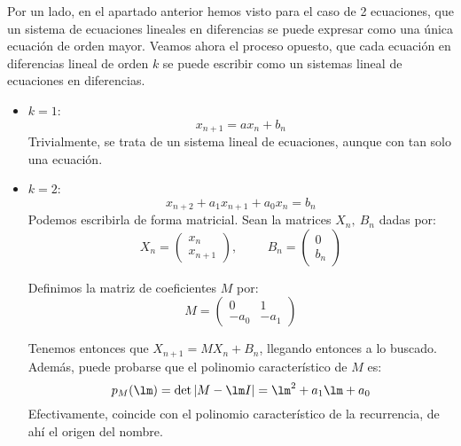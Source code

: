 Por un lado, en el apartado anterior hemos visto para el caso de 2 ecuaciones, que un sistema de ecuaciones lineales en diferencias se puede expresar como una única ecuación de orden mayor. Veamos ahora el proceso opuesto, que cada ecuación en diferencias lineal de orden $k$ se puede escribir como un sistemas lineal de ecuaciones en diferencias.
\begin{itemize}
    \item\ul{$k=1$}:
    \begin{equation*}
        x_{n+1} = ax_n + b_n
    \end{equation*}
    Trivialmente, se trata de un sistema lineal de ecuaciones, aunque con tan solo una ecuación.
    \item\ul{$k=2$}:
    \begin{equation*}
        x_{n+2} + a_1 x_{n+1} + a_0 x_n = b_n
    \end{equation*}
    Podemos escribirla de forma matricial. Sean la matrices $X_n,~B_n$ dadas por:
    \begin{equation*}
        X_n = \left( \begin{array}{c}
            x_n \\
            x_{n+1}
        \end{array}\right),\hspace{1cm}
        B_n = \left( \begin{array}{c}
            0 \\
            b_n
        \end{array}\right)
    \end{equation*}
    
    Definimos la matriz de coeficientes $M$ por:
    \begin{equation*}
        M = \left(\begin{array}{cc}
            0 & 1 \\
            -a_0 & -a_1
        \end{array}\right)
    \end{equation*}
    
    Tenemos entonces que $X_{n+1} = M X_n + B_n$, llegando entonces a lo buscado. Además, puede probarse que el polinomio característico de $M$ es:
    \begin{equation*}
        p_M(\lm) = \det |M-\lm I| = \lm^2 + a_{1}\lm+ a_0
    \end{equation*}
    Efectivamente, coincide con el polinomio característico de la recurrencia, de ahí el origen del nombre.
    

\end{itemize}
